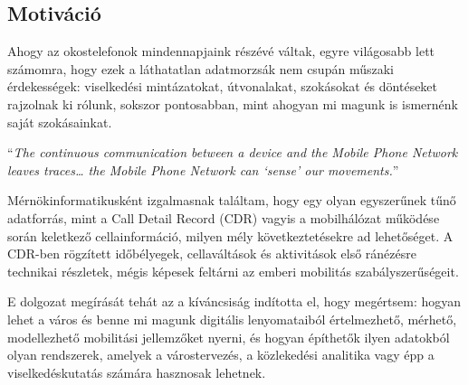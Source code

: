\subsection{Motiváció}

 Ahogy az okostelefonok mindennapjaink részévé váltak, egyre világosabb lett számomra, hogy ezek a láthatatlan adatmorzsák nem csupán műszaki érdekességek: viselkedési mintázatokat, útvonalakat, szokásokat és döntéseket rajzolnak ki rólunk, sokszor pontosabban, mint ahogyan mi magunk is ismernénk saját szokásainkat.

\enquote{\textit{The continuous communication between a device and the Mobile Phone Network leaves traces… the Mobile Phone Network can ‘sense’ our movements.}}%
\cite{pinter2021evaluating}

Mérnökinformatikusként  izgalmasnak találtam, hogy egy olyan egyszerűnek tűnő adatforrás, mint a Call Detail Record (CDR) vagyis a mobilhálózat működése során keletkező cellainformáció, milyen mély következtetésekre ad lehetőséget. A CDR-ben rögzített időbélyegek, cellaváltások és aktivitások első ránézésre technikai részletek, mégis képesek feltárni az emberi mobilitás szabályszerűségeit.


E dolgozat megírását tehát az a kíváncsiság indította el, hogy megértsem:
hogyan lehet a város és benne mi magunk digitális lenyomataiból értelmezhető, mérhető, modellezhető mobilitási jellemzőket nyerni, és hogyan építhetők ilyen adatokból olyan rendszerek, amelyek a várostervezés, a közlekedési analitika vagy épp a viselkedéskutatás számára hasznosak lehetnek.



